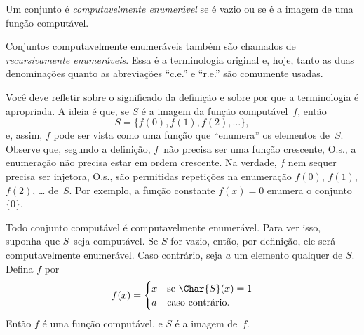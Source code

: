 \documentclass[../../../include/open-logic-section]{subfiles}
\begin{document}

\begin{defn}
Um conjunto é \emph{computavelmente enumerável} se é vazio ou se é a
imagem de uma função computável.
\end{defn}

\begin{history}
Conjuntos computavelmente enumeráveis também são chamados de
\emph{recursivamente enumeráveis}. Essa é a terminologia original e,
hoje, tanto as duas denominações quanto as abreviações ``c.e.'' e
``r.e.'' são comumente usadas.
\end{history}

\begin{explain}
Você deve refletir sobre o significado da definição e sobre por que a
terminologia é apropriada. A ideia é que, se $S$ é a imagem da função
computável~$f$, então
\[
S = \{ f(0), f(1), f(2), \dots \},
\]
e, assim, $f$ pode ser vista como uma função que ``enumera'' os
elementos de~$S$. Observe que, segundo a definição, $f$~não precisa ser
uma função crescente, O.s.\@, a enumeração não precisa estar em ordem
crescente. Na verdade, $f$ nem sequer precisa ser injetora, O.s.\@,
são permitidas repetições na enumeração $f(0)$, $f(1)$, $f(2)$,
\dots{} de~$S$. Por exemplo, a função constante $f(x) = 0$ enumera o
conjunto $\{ 0 \}$.
\end{explain}

Todo conjunto computável é computavelmente enumerável. Para ver isso,
suponha que $S$~seja computável. Se $S$ for vazio, então, por definição,
ele será computavelmente enumerável. Caso contrário, seja $a$ um
elemento qualquer de $S$. Defina $f$ por
\[
f(x) =
\begin{cases}
x & \text{se $\Char{S}(x) = 1$} \\
a & \text{caso contrário.}
\end{cases}
\]
Então $f$ é uma função computável, e $S$ é a imagem de~$f$.
\end{document}
